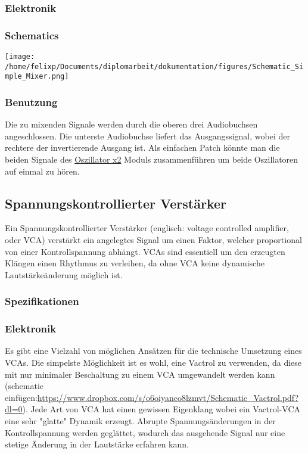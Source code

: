 \subsubsection{Elektronik}
\label{sec:org82b5439}
\subsubsection{Schematics}
\label{sec:org9c3c350}
\begin{center}
\texttt{[image: /home/felixp/Documents/diplomarbeit/dokumentation/figures/Schematic\_Simple\_Mixer.png]}
\end{center}
\subsubsection{Benutzung}
\label{sec:orgd01b2d2}
Die zu mixenden Signale werden durch die oberen drei Audiobuchsen angeschlossen. Die unterste Audiobuchse liefert das Ausgangssignal, wobei der rechtere der invertierende Ausgang ist. Als einfachen Patch könnte man die beiden Signale des \href{modules/oscillator.org}{Oszillator x2} Moduls zusammenführen um beide Oszillatoren auf einmal zu hören.

\subsection{Spannungskontrollierter Verstärker}
\label{sec:orgf59bcb4}
Ein Spannungskontrollierter Verstärker (englisch: voltage controlled amplifier, oder VCA) verstärkt ein angelegtes Signal um einen Faktor, welcher proportional von einer Kontrollspannung abhängt. VCAs sind essentiell um den erzeugten Klängen einen Rhythmus zu verleihen, da ohne VCA keine dynamische Lautstärkeänderung möglich ist. 
\subsubsection{Spezifikationen}
\label{sec:orgf58afbd}
\subsubsection{Elektronik}
\label{sec:org2d2bb0f}
Es gibt eine Vielzahl von möglichen Ansätzen für die technische Umsetzung eines VCAs. Die simpelste Möglichkeit ist es wohl, eine Vactrol zu verwenden, da diese mit nur minimaler Beschaltung zu einem VCA umgewandelt werden kann (schematic einfügen:\url{https://www.dropbox.com/s/o6oiyanco8lzmvt/Schematic\_Vactrol.pdf?dl=0}). Jede Art von VCA hat einen gewissen Eigenklang wobei ein Vactrol-VCA eine sehr "glatte" Dynamik erzeugt. Abrupte Spannungsänderungen in der Kontrollspannung werden geglättet, wodurch das ausgehende Signal nur eine stetige Änderung in der Lautstärke erfahren kann.


